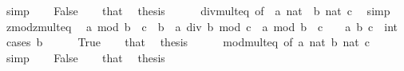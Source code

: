 \begin{isabellebody}
\ simp\isanewline
{}\isamarkupfalse%
\isanewline
\ \ \isamarkupfalse%
\ False\isanewline
\ \ \isamarkupfalse%
\ that\ \isamarkupfalse%
\ {\isacharquery}{\kern0pt}thesis\isanewline
\ \ \ \ \isamarkupfalse%
\ div{\isacharunderscore}{\kern0pt}mult{}{\isacharunderscore}{\kern0pt}eq{\isacharprime}{\kern0pt}\ {\isacharbrackleft}{\kern0pt}of\ {\isacartoucheopen}{\isacharminus}{\kern0pt}\ a{\isacartoucheclose}\ {\isacartoucheopen}nat\ {\isacharparenleft}{\kern0pt}{\isacharminus}{\kern0pt}\ b{\isacharparenright}{\kern0pt}{\isacartoucheclose}\ {\isacartoucheopen}nat\ c{\isacartoucheclose}{\isacharbrackright}{\kern0pt}\ \isamarkupfalse%
\ simp\isanewline
{}\isamarkupfalse%
%
\endisatagproof
{\isafoldproof}%
%
\isadelimproof
\isanewline
%
\endisadelimproof
\isanewline
{}\isamarkupfalse%
\ zmod{\isacharunderscore}{\kern0pt}zmult{}{\isacharunderscore}{\kern0pt}eq{\isacharcolon}{\kern0pt}\isanewline
\ \ {\isacartoucheopen}a\ mod\ {\isacharparenleft}{\kern0pt}b\ {\isacharasterisk}{\kern0pt}\ c{\isacharparenright}{\kern0pt}\ {\isacharequal}{\kern0pt}\ b\ {\isacharasterisk}{\kern0pt}\ {\isacharparenleft}{\kern0pt}a\ div\ b\ mod\ c{\isacharparenright}{\kern0pt}\ {\isacharplus}{\kern0pt}\ a\ mod\ b{\isacartoucheclose}\ \ {\isacartoucheopen}c\ {\isasymge}\ {}{\isacartoucheclose}\ \ a\ b\ c\ {\isacharcolon}{\kern0pt}{\isacharcolon}{\kern0pt}\ int\isanewline
%
\isadelimproof
%
\endisadelimproof
%
\isatagproof
{}\isamarkupfalse%
\ {\isacharparenleft}{\kern0pt}cases\ {\isacartoucheopen}b\ {\isasymge}\ {}{\isacartoucheclose}{\isacharparenright}{\kern0pt}\isanewline
\ \ \isamarkupfalse%
\ True\isanewline
\ \ \isamarkupfalse%
\ that\ \isamarkupfalse%
\ {\isacharquery}{\kern0pt}thesis\isanewline
\ \ \ \ \isamarkupfalse%
\ mod{\isacharunderscore}{\kern0pt}mult{}{\isacharunderscore}{\kern0pt}eq{\isacharprime}{\kern0pt}\ {\isacharbrackleft}{\kern0pt}of\ a\ {\isacartoucheopen}nat\ b{\isacartoucheclose}\ {\isacartoucheopen}nat\ c{\isacartoucheclose}{\isacharbrackright}{\kern0pt}\ \isamarkupfalse%
\ simp\isanewline
{}\isamarkupfalse%
\isanewline
\ \ \isamarkupfalse%
\ False\isanewline
\ \ \isamarkupfalse%
\ that\ \isamarkupfalse%
\ {\isacharquery}{\kern0pt}thesis\isanewline
\ \ \ \ \isamarkupfalse%

\end{isabellebody}
